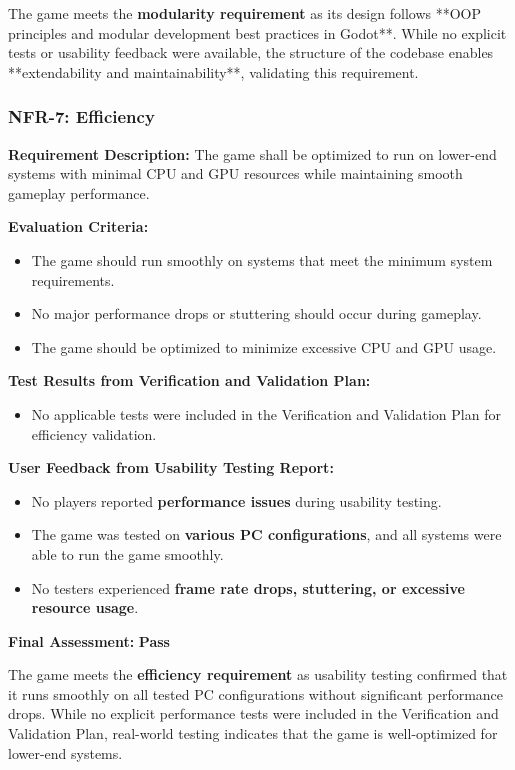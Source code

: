 \documentclass[12pt, titlepage]{article}
\begin{document}
The game meets the \textbf{modularity requirement} as its design follows **OOP principles and modular development best practices in Godot**. While no explicit tests or usability feedback were available, the structure of the codebase enables **extendability and maintainability**, validating this requirement.


\subsubsection{NFR-7: Efficiency}
\label{NFR7}

\textbf{Requirement Description:}  
The game shall be optimized to run on lower-end systems with minimal CPU and GPU resources while maintaining smooth gameplay performance.

\textbf{Evaluation Criteria:}  
\begin{itemize}
    \item The game should run smoothly on systems that meet the minimum system requirements.
    \item No major performance drops or stuttering should occur during gameplay.
    \item The game should be optimized to minimize excessive CPU and GPU usage.
\end{itemize}

\textbf{Test Results from Verification and Validation Plan:}  
\begin{itemize}
    \item No applicable tests were included in the Verification and Validation Plan for efficiency validation.
\end{itemize}

\textbf{User Feedback from Usability Testing Report:}  
\begin{itemize}
    \item No players reported \textbf{performance issues} during usability testing.
    \item The game was tested on \textbf{various PC configurations}, and all systems were able to run the game smoothly.
    \item No testers experienced \textbf{frame rate drops, stuttering, or excessive resource usage}.
\end{itemize}

\textbf{Final Assessment:} \textbf{Pass} 
 
The game meets the \textbf{efficiency requirement} as usability testing confirmed that it runs smoothly on all tested PC configurations without significant performance drops. While no explicit performance tests were included in the Verification and Validation Plan, real-world testing indicates that the game is well-optimized for lower-end systems.
\end{document}

